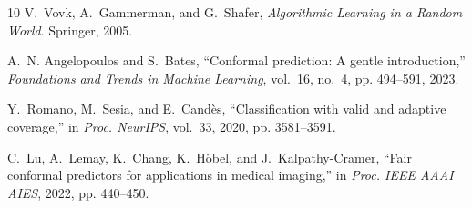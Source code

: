 \documentclass[journal]{IEEEtran}
\begin{document}
\begin{thebibliography}{10}
V.~Vovk, A.~Gammerman, and G.~Shafer, \textit{Algorithmic Learning in a Random World}. Springer, 2005.

A.~N. Angelopoulos and S.~Bates, ``Conformal prediction: A gentle introduction,'' \textit{Foundations and Trends in Machine Learning}, vol.~16, no.~4, pp. 494--591, 2023.

Y.~Romano, M.~Sesia, and E.~Cand{\`e}s, ``Classification with valid and adaptive coverage,'' in \textit{Proc. NeurIPS}, vol.~33, 2020, pp. 3581--3591.

C.~Lu, A.~Lemay, K.~Chang, K.~H{\"o}bel, and J.~Kalpathy-Cramer, ``Fair conformal predictors for applications in medical imaging,'' in \textit{Proc. IEEE AAAI AIES}, 2022, pp. 440--450.

\end{thebibliography}
\end{document}

